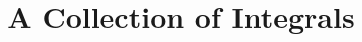 \documentclass[11pt,a4paper]{article}
\newcommand{\ds}{\displaystyle}
\theoremstyle{definition}
\newtheorem*{problem}{Problem}
\newtheorem*{solution}{Solution}
\begin{document}
\title{\texorpdfstring{\vspace{-16mm} A Collection of Integrals}{A Collection of Integrals}} 
\author{\vspace{-5em}}
\date{\vspace{-5em}}
\maketitle
\thispagestyle{firststyle}

%
%
%
%
%
%
%
%
%
%
%
%
%
%
%
%
%
%
%
%
%
%
%
\end{document}
